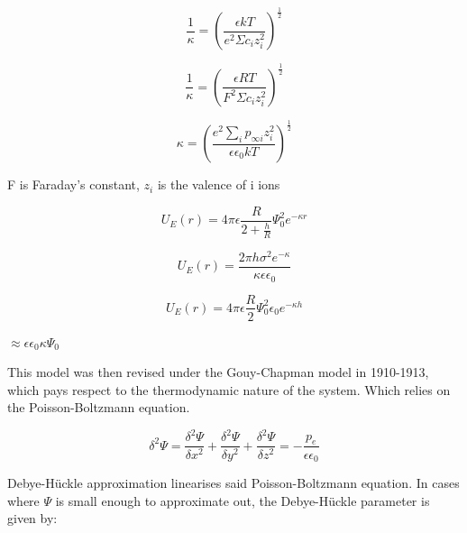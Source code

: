 \begin{equation} 
\frac{1}{\kappa} = \left(\frac{\epsilon kT}{e^2 \Sigma c_i z_i^2}\right)^\frac{1}{2}
\end{equation}

\begin{equation} 
\frac{1}{\kappa} = \left(\frac{\epsilon RT}{F^2 \Sigma c_i z_i^2}\right)^\frac{1}{2}
\end{equation}

\begin{equation} 
\kappa = \left(\frac{e^2 \sum_{i} p_{\infty i} z_i^2} {\epsilon \epsilon_0 k T}  \right)^\frac{1}{2} 
\end{equation}\textbf{}

 F is Faraday's constant, $z_i$ is the valence of i ions
 
\begin{equation} %
U_E (r) = 4\pi\epsilon \frac{R}{2 + \frac{h}{R}}\Psi^2_{0} e^{-\kappa r}
\end{equation}

\begin{equation} 
U_E (r) = \frac{2\pi h \sigma^2 e^{-\kappa}}{\kappa \epsilon \epsilon_0}
\end{equation}

\begin{equation} %
U_E (r) = 4\pi\epsilon \frac{R}{2}\Psi^2_{0} \epsilon_0 e^{-\kappa h}
\end{equation}

 $\approx \epsilon \epsilon_0 \kappa \Psi_0$
 

This model was then revised under the Gouy-Chapman model in 1910-1913, \cite{34} which pays respect to the thermodynamic nature of the system. Which relies on the Poisson-Boltzmann equation.

\begin{equation} %
\delta ^2 \Psi = \frac{\delta^2 \Psi}{\delta x^2} + \frac{\delta^2 \Psi}{\delta y^2} + \frac{\delta^2 \Psi}{\delta z^2} = - \frac{p_e}{\epsilon \epsilon_0}
\end{equation}

Debye-H\"uckle approximation linearises said Poisson-Boltzmann equation. In cases where $\Psi$ is small enough to approximate out, the Debye-H\"uckle parameter is given by: %

